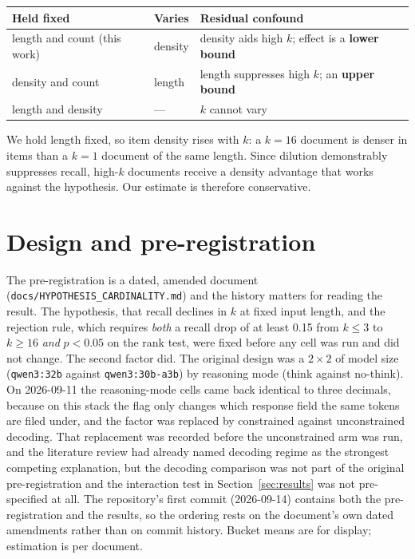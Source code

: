 \documentclass[11pt]{article}
\newcommand{\code}[1]{\texttt{\small #1}}
\begin{document}
\begin{center}
\small
\begin{tabular}{lll}
\toprule
Held fixed & Varies & Residual confound \\
\midrule
length and count (this work) & density & density aids high $k$; effect is a \textbf{lower bound} \\
density and count & length & length suppresses high $k$; an \textbf{upper bound} \\
length and density & --- & $k$ cannot vary \\
\bottomrule
\end{tabular}
\end{center}

We hold length fixed, so item density rises with $k$: a $k = 16$ document is
denser in items than a $k = 1$ document of the same length. Since dilution
demonstrably suppresses recall, high-$k$ documents receive a density advantage
that works against the hypothesis. Our estimate is therefore conservative.

\section{Design and pre-registration}

The pre-registration is a dated, amended document
(\code{docs/HYPOTHESIS\_CARDINALITY.md}) and the history matters for reading the
result. The hypothesis, that recall declines in $k$ at fixed input length, and
the rejection rule, which requires \emph{both} a recall drop of at least 0.15
from $k \le 3$ to $k \ge 16$ \emph{and} $p < 0.05$ on the rank test, were fixed
before any cell was run and did not change. The second factor did. The original
design was a $2 \times 2$ of model size (\code{qwen3:32b} against
\code{qwen3:30b-a3b}) by reasoning mode (think against no-think). On 2026-09-11
the reasoning-mode cells came back identical to three decimals, because on this
stack the flag only changes which response field the same tokens are filed
under, and the factor was replaced by constrained against unconstrained decoding.
That replacement was recorded before the unconstrained arm was run, and the
literature review had already named decoding regime as the strongest competing
explanation, but the decoding comparison was not part of the original
pre-registration and the interaction test in Section~\ref{sec:results} was not
pre-specified at all. The repository's first commit (2026-09-14) contains both
the pre-registration and the results, so the ordering rests on the document's
own dated amendments rather than on commit history. Bucket means are for
display; estimation is per document.
\end{document}
